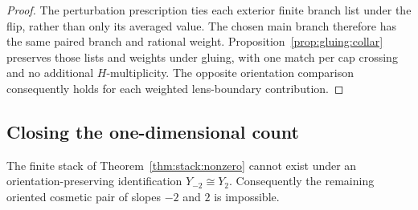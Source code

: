 \begin{proof}
The perturbation prescription ties each exterior finite branch list
under the flip, rather than only its averaged value.  The chosen main
branch therefore has the same paired branch and rational weight.
Proposition~\ref{prop:gluing:collar} preserves those lists and weights
under gluing, with one match per cap crossing and no additional
$H$-multiplicity.  The opposite orientation comparison consequently
holds for each weighted lens-boundary contribution.
\end{proof}

\subsection{Closing the one-dimensional count}

\begin{theorem}
\label{thm:gluing:contradiction}
The finite stack of Theorem~\ref{thm:stack:nonzero} cannot exist
under an orientation-preserving identification $Y_{-2}\cong Y_2$.
Consequently the remaining oriented cosmetic pair of slopes
$-2$ and $2$ is impossible.
\end{theorem}

